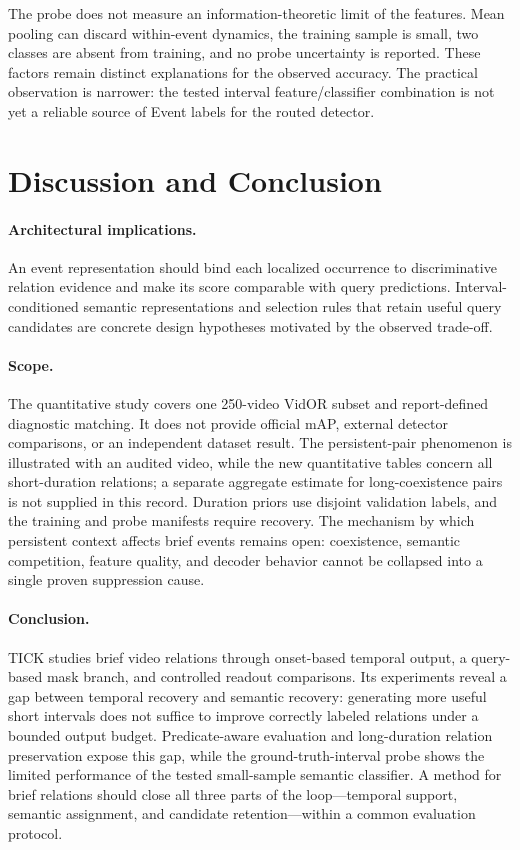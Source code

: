 \documentclass[10pt,twocolumn,letterpaper]{article}
\newcommand{\method}{TICK\xspace}
\begin{document}
The probe does not measure an information-theoretic limit of the features. Mean pooling can discard within-event dynamics, the training sample is small, two classes are absent from training, and no probe uncertainty is reported. These factors remain distinct explanations for the observed accuracy. The practical observation is narrower: the tested interval feature/classifier combination is not yet a reliable source of Event labels for the routed detector.

\section{Discussion and Conclusion}
\paragraph{Architectural implications.}
An event representation should bind each localized occurrence to discriminative relation evidence and make its score comparable with query predictions. Interval-conditioned semantic representations and selection rules that retain useful query candidates are concrete design hypotheses motivated by the observed trade-off.

\paragraph{Scope.}
The quantitative study covers one 250-video VidOR subset and report-defined diagnostic matching. It does not provide official mAP, external detector comparisons, or an independent dataset result. The persistent-pair phenomenon is illustrated with an audited video, while the new quantitative tables concern all short-duration relations; a separate aggregate estimate for long-coexistence pairs is not supplied in this record. Duration priors use disjoint validation labels, and the training and probe manifests require recovery. The mechanism by which persistent context affects brief events remains open: coexistence, semantic competition, feature quality, and decoder behavior cannot be collapsed into a single proven suppression cause.

\paragraph{Conclusion.}
\method studies brief video relations through onset-based temporal output, a query-based mask branch, and controlled readout comparisons. Its experiments reveal a gap between temporal recovery and semantic recovery: generating more useful short intervals does not suffice to improve correctly labeled relations under a bounded output budget. Predicate-aware evaluation and long-duration relation preservation expose this gap, while the ground-truth-interval probe shows the limited performance of the tested small-sample semantic classifier. A method for brief relations should close all three parts of the loop---temporal support, semantic assignment, and candidate retention---within a common evaluation protocol.
\end{document}
